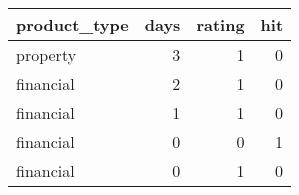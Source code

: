 \begin{tabular}{lrrr}
\toprule
product\_type &  days &  rating &  hit \\
\midrule
    property &     3 &       1 &    0 \\
   financial &     2 &       1 &    0 \\
   financial &     1 &       1 &    0 \\
   financial &     0 &       0 &    1 \\
   financial &     0 &       1 &    0 \\
\bottomrule
\end{tabular}
